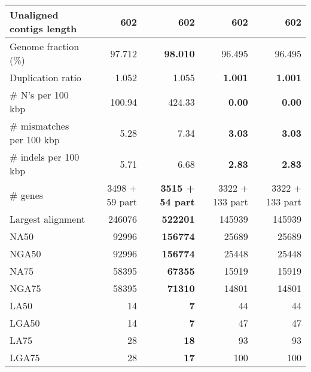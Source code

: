 \documentclass[12pt,a4paper]{article}
\begin{document}
\begin{table}[ht]
\begin{center}
\begin{tabular}{|l*{4}{|r}|}
Unaligned contigs length & 602 & 602 & 602 & 602 \\ \hline
Genome fraction (\%) & 97.712 & {\bf 98.010} & 96.495 & 96.495 \\ \hline
Duplication ratio & 1.052 & 1.055 & {\bf 1.001} & {\bf 1.001} \\ \hline
\# N's per 100 kbp & 100.94 & 424.33 & {\bf 0.00} & {\bf 0.00} \\ \hline
\# mismatches per 100 kbp & 5.28 & 7.34 & {\bf 3.03} & {\bf 3.03} \\ \hline
\# indels per 100 kbp & 5.71 & 6.68 & {\bf 2.83} & {\bf 2.83} \\ \hline
\# genes & 3498 + 59 part & {\bf 3515 + 54 part} & 3322 + 133 part & 3322 + 133 part \\ \hline
Largest alignment & 246076 & {\bf 522201} & 145939 & 145939 \\ \hline
NA50 & 92996 & {\bf 156774} & 25689 & 25689 \\ \hline
NGA50 & 92996 & {\bf 156774} & 25448 & 25448 \\ \hline
NA75 & 58395 & {\bf 67355} & 15919 & 15919 \\ \hline
NGA75 & 58395 & {\bf 71310} & 14801 & 14801 \\ \hline
LA50 & 14 & {\bf 7} & 44 & 44 \\ \hline
LGA50 & 14 & {\bf 7} & 47 & 47 \\ \hline
LA75 & 28 & {\bf 18} & 93 & 93 \\ \hline
LGA75 & 28 & {\bf 17} & 100 & 100 \\ \hline
\end{tabular}
\end{center}
\end{table}
\end{document}
